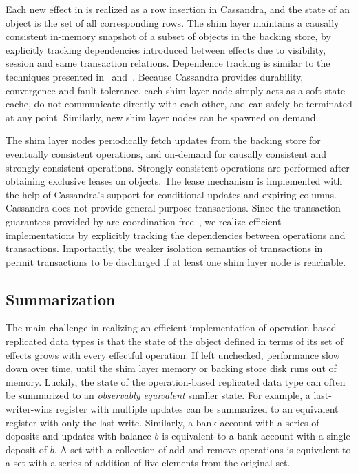 Each new effect in \name is realized as a row insertion in Cassandra, and the
state of an object is the set of all corresponding rows. The shim layer
maintains a causally consistent in-memory snapshot of a subset of objects in
the backing store, by explicitly tracking dependencies introduced between
effects due to visibility, session and same transaction relations. Dependence
tracking is similar to the techniques presented in~\cite{BoltOn}
and~\cite{Eiger}. Because Cassandra provides durability, convergence and fault
tolerance, each shim layer node simply acts as a soft-state cache, do not
communicate directly with each other, and can safely be terminated at any
point. Similarly, new shim layer nodes can be spawned on demand.

The shim layer nodes periodically fetch updates from the backing store for
eventually consistent operations, and on-demand for causally consistent and
strongly consistent operations. Strongly consistent operations are performed
after obtaining exclusive leases on objects. The lease mechanism is implemented
with the help of Cassandra's support for conditional updates and expiring
columns. Cassandra does not provide general-purpose transactions. Since the
transaction guarantees provided by \name are
coordination-free~\cite{BailisHAT}, we realize efficient implementations by
explicitly tracking the dependencies between operations and transactions.
Importantly, the weaker isolation semantics of transactions in \name permit
transactions to be discharged if at least one shim layer node is reachable.

\subsection{Summarization}

The main challenge in realizing an efficient implementation of operation-based
replicated data types is that the state of the object defined in terms of its
set of effects grows with every effectful operation. If left unchecked,
performance slow down over time, until the shim layer memory or backing store
disk runs out of memory. Luckily, the state of the operation-based replicated
data type can often be summarized to an \emph{observably equivalent} smaller
state. For example, a last-writer-wins register with multiple updates can be
summarized to an equivalent register with only the last write. Similarly, a
bank account with a series of deposits and updates with balance $b$ is
equivalent to a bank account with a single deposit of $b$. A set with a
collection of add and remove operations is equivalent to a set with a series of
addition of live elements from the original set.


